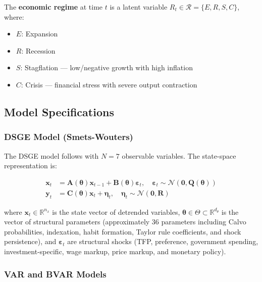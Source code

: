 \documentclass[12pt,a4paper]{article}
\begin{document}
The \textbf{economic regime} at time $t$ is a latent variable
$R_t \in \mathcal{R} = \{E, R, S, C\}$, where:
\begin{itemize}[leftmargin=*]
    \item $E$: Expansion
    \item $R$: Recession
    \item $S$: Stagflation --- low/negative growth with high inflation
    \item $C$: Crisis --- financial stress with severe output contraction
\end{itemize}

\subsection{Model Specifications}

\subsubsection{DSGE Model (Smets-Wouters)}

The DSGE model follows \citet{smets2007shocks} with $N=7$ observable
variables.  The state-space representation is:

\begin{align}
    \mathbf{x}_t &= \mathbf{A}(\boldsymbol{\theta}) \mathbf{x}_{t-1}
                   + \mathbf{B}(\boldsymbol{\theta}) \boldsymbol{\varepsilon}_t,
                   \quad \boldsymbol{\varepsilon}_t \sim \mathcal{N}(\mathbf{0},
                   \mathbf{Q}(\boldsymbol{\theta})) \label{eq:dsge_state} \\
    \mathbf{y}_t &= \mathbf{C}(\boldsymbol{\theta}) \mathbf{x}_t
                   + \boldsymbol{\eta}_t, \quad \boldsymbol{\eta}_t \sim
                   \mathcal{N}(\mathbf{0}, \mathbf{R}) \label{eq:dsge_obs}
\end{align}

where $\mathbf{x}_t \in \mathbb{R}^{n_x}$ is the state vector of detrended
variables, $\boldsymbol{\theta} \in \Theta \subset \mathbb{R}^{d_\theta}$
is the vector of structural parameters (approximately 36 parameters including
Calvo probabilities, indexation, habit formation, Taylor rule coefficients,
and shock persistence), and $\boldsymbol{\varepsilon}_t$ are structural
shocks (TFP, preference, government spending, investment-specific, wage
markup, price markup, and monetary policy).

\subsubsection{VAR and BVAR Models}
\end{document}
